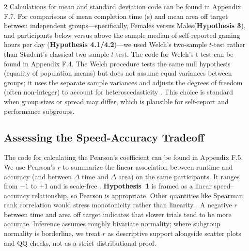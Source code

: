 \documentclass[a4paper,12pt]{article}
\begin{document}
\begin{multicols}{2}
Calculations for mean and standard deviation code can be found in Appendix F.7. For comparisons of mean completion time (s) and mean area off target between independent groups---specifically,  Females versus Males(\textbf{Hypothesis 3}), and participants below versus above the sample median of self-reported gaming hours per day (\textbf{Hypothesis 4.1/4.2})---we used Welch's two-sample $t$-test rather than Student's classical two-sample $t$-test. The code for Welch's t-test can be found in Appendix F.4. 
The Welch procedure tests the same null hypothesis (equality of population means) but does not assume equal variances between groups; it uses the separate sample variances and adjusts the degrees of freedom (often non-integer) to account for heteroscedasticity \cite{delacre2022correction}.
This choice is standard when group sizes or spread may differ, which is plausible for self-report and performance subgroups.
 
\subsection{Assessing the Speed-Accuracy Tradeoff} \label{speedacc}
The code for calculating the Pearson's coefficient can be found in Appendix F.5. We use Pearson's $r$ to summarize the linear association between runtime and accuracy (and between $\Delta$ time and $\Delta$ area) on the same participants. It ranges from $-1$ to $+1$ and is scale-free \cite{rays2024correlation}. \textbf{Hypothesis~1} is framed as a linear speed--accuracy relationship, so Pearson is appropriate. Other quantities like Spearman rank correlation would stress monotonicity rather than linearity \cite{laerd2018spearman}. A negative $r$ between time and area off target indicates that slower trials tend to be more accurate. Inference assumes roughly bivariate normality; where subgroup normality is borderline, we treat $r$ as descriptive support alongside scatter plots and QQ checks, not as a strict distributional proof.

\end{multicols}
\end{document}
